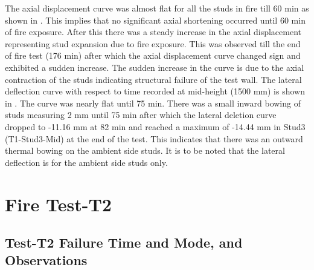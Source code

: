 The axial displacement curve was almost flat for all the studs in fire till 60 min as shown in . This implies that no significant axial shortening occurred until 60 min of fire exposure. After this there was a steady increase in the axial displacement representing stud expansion due to fire exposure. This was observed till the end of fire test (176 min) after which the axial displacement curve changed sign and exhibited a sudden increase. The sudden increase in the curve is due to the axial contraction of the studs indicating structural failure of the test wall. The lateral deflection curve with respect to time recorded at mid-height (1500 mm) is shown in . The curve was nearly flat until 75 min. There was a small inward bowing of studs measuring 2 mm until 75 min after which the lateral deletion curve dropped to -11.16 mm at 82 min and reached a maximum of -14.44 mm in Stud3 (T1-Stud3-Mid) at the end of the test. This indicates that there was an outward thermal bowing on the ambient side studs. It is to be noted that the lateral deflection is for the ambient side studs only.

\section{Fire Test-T2}\label{sec:t2-fire-test}
\subsection{Test-T2 Failure Time and Mode, and Observations}

